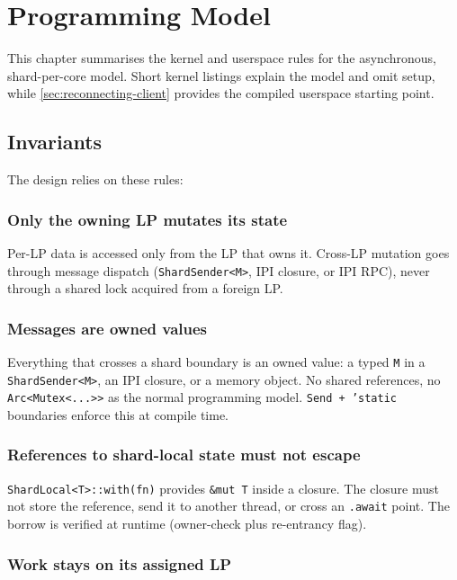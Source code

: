\chapter{Programming Model}
\label{chap:programming-model}

This chapter summarises the kernel and userspace rules for the asynchronous,
shard-per-core model. Short kernel listings explain the model and omit setup, while
\autoref{sec:reconnecting-client} provides the compiled userspace starting point.

\section{Invariants}

The design relies on these rules:

\subsection{Only the owning LP mutates its state}

Per-LP data is accessed only from the LP that owns it. Cross-LP mutation goes
through message dispatch (\texttt{ShardSender<M>}, IPI closure, or IPI RPC),
never through a shared lock acquired from a foreign LP.

\subsection{Messages are owned values}

Everything that crosses a shard boundary is an owned value: a typed
\texttt{M} in a \texttt{ShardSender<M>}, an IPI closure, or a memory object.
No shared references, no \texttt{Arc<Mutex<...>{>}} as the normal programming
model. \texttt{Send + 'static} boundaries enforce this at compile time.

\subsection{References to shard-local state must not escape}

\texttt{ShardLocal<T>::with(fn)} provides \texttt{\&mut T} inside a closure.
The closure must not store the reference, send it to another thread, or cross
an \texttt{.await} point. The borrow is verified at runtime (owner-check plus
re-entrancy flag).

\subsection{Work stays on its assigned LP}

